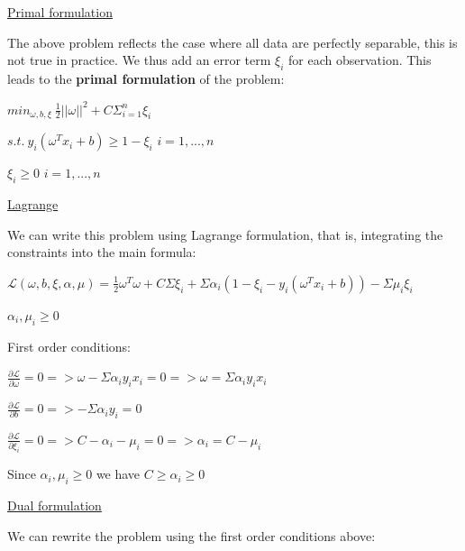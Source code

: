 \vspace{5mm}

\underline{Primal formulation}

\vspace{5mm}

The above problem reflects the case where all data are perfectly separable, this is not true in practice. We thus add an error term $\xi_i$ for each observation. This leads to the \textbf{primal formulation} of the problem:

\begin{center}
$min_{\omega,b, \xi}~\frac{1}{2}||\omega||^2+C\Sigma_{i=1}^{n}\xi_i$

$s.t.~y_i(\omega^Tx_i+b) \geq 1 - \xi_i$ $i=1,...,n$

$\xi_i \geq 0$ $i=1,...,n$
\end{center}

\vspace{5mm}

\underline{Lagrange}

\vspace{5mm}

We can write this problem using Lagrange formulation, that is, integrating the constraints into the main formula:

$\mathcal{L}(\omega,b,\xi, \alpha, \mu) = \frac{1}{2}\omega^T\omega+C\Sigma \xi_i + \Sigma \alpha_i (1-\xi_i - y_i(\omega^Tx_i+b)) - \Sigma \mu_i \xi_i$

$\alpha_i, \mu_i \geq 0$

\vspace{5mm}

First order conditions:

$\frac{\partial\mathcal{L}}{\partial\omega} = 0 => \omega - \Sigma \alpha_i y_i x_i = 0 => \omega = \Sigma \alpha_i y_i x_i$

$\frac{\partial\mathcal{L}}{\partial b} = 0 => -\Sigma \alpha_i y_i = 0$

$\frac{\partial\mathcal{L}}{\partial \xi_i} = 0 => C - \alpha_i  - \mu_i = 0 => \alpha_i = C - \mu_i$

Since $\alpha_i, \mu_i \geq 0$ we have $C \geq \alpha_i \geq 0$

\vspace{5mm}

\underline{Dual formulation}

\vspace{5mm}

We can rewrite the problem using the first order conditions above:

